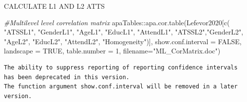 \documentclass[
  11pt,
]{book}
\newenvironment{Shaded}{\begin{snugshade}}{\end{snugshade}}
\newcommand{\AttributeTok}[1]{\textcolor[rgb]{0.77,0.63,0.00}{#1}}
\newcommand{\CommentTok}[1]{\textcolor[rgb]{0.56,0.35,0.01}{\textit{#1}}}
\newcommand{\ConstantTok}[1]{\textcolor[rgb]{0.00,0.00,0.00}{#1}}
\newcommand{\DecValTok}[1]{\textcolor[rgb]{0.00,0.00,0.81}{#1}}
\newcommand{\FunctionTok}[1]{\textcolor[rgb]{0.00,0.00,0.00}{#1}}
\newcommand{\NormalTok}[1]{#1}
\newcommand{\OtherTok}[1]{\textcolor[rgb]{0.56,0.35,0.01}{#1}}
\newcommand{\SpecialCharTok}[1]{\textcolor[rgb]{0.00,0.00,0.00}{#1}}
\newcommand{\StringTok}[1]{\textcolor[rgb]{0.31,0.60,0.02}{#1}}
\begin{document}
\begin{Shaded}
\end{Shaded}

CALCULATE L1 AND L2 ATTS

\begin{Shaded}
\begin{Highlighting}[]
\CommentTok{\#Multilevel level correlation matrix}
\NormalTok{apaTables}\SpecialCharTok{::}\FunctionTok{apa.cor.table}\NormalTok{(Lefevor2020[}\FunctionTok{c}\NormalTok{(}
\StringTok{"ATSSL1"}\NormalTok{, }\StringTok{"GenderL1"}\NormalTok{, }\StringTok{"AgeL1"}\NormalTok{, }\StringTok{"EducL1"}\NormalTok{, }\StringTok{"AttendL1"}\NormalTok{,}
\StringTok{"ATSSL2"}\NormalTok{,}\StringTok{"GenderL2"}\NormalTok{, }\StringTok{"AgeL2"}\NormalTok{, }\StringTok{"EducL2"}\NormalTok{, }\StringTok{"AttendL2"}\NormalTok{, }\StringTok{"Homogeneity"}\NormalTok{)], }\AttributeTok{show.conf.interval =} \ConstantTok{FALSE}\NormalTok{, }\AttributeTok{landscape =} \ConstantTok{TRUE}\NormalTok{, }\AttributeTok{table.number =} \DecValTok{1}\NormalTok{, }\AttributeTok{filename=}\StringTok{"ML\_CorMatrix.doc"}\NormalTok{)}
\end{Highlighting}
\end{Shaded}

\begin{verbatim}
The ability to suppress reporting of reporting confidence intervals has been deprecated in this version.
The function argument show.conf.interval will be removed in a later version.
\end{verbatim}
\end{document}
